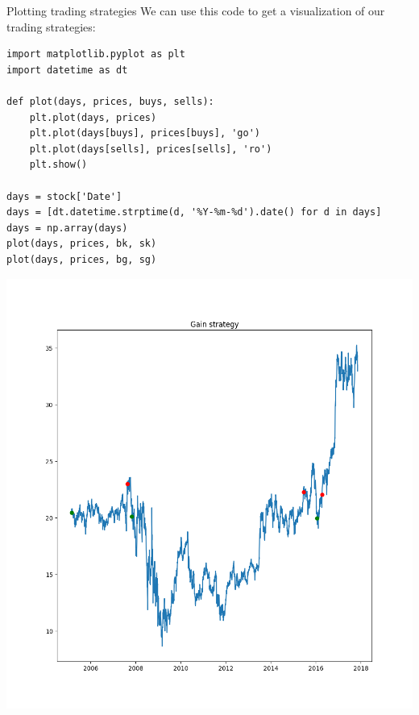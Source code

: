 \documentclass[aspectratio=169,handout]{beamer}
\begin{document}
\begin{frame}[fragile]{Plotting trading strategies}
    We can use this code to get a visualization of our trading strategies:
    \begin{minipage}{0.49\textwidth}
        \begin{verbatim}
import matplotlib.pyplot as plt
import datetime as dt

def plot(days, prices, buys, sells):
    plt.plot(days, prices)
    plt.plot(days[buys], prices[buys], 'go')
    plt.plot(days[sells], prices[sells], 'ro')
    plt.show()

days = stock['Date']
days = [dt.datetime.strptime(d, '%Y-%m-%d').date() for d in days]
days = np.array(days)
plot(days, prices, bk, sk)
plot(days, prices, bg, sg)
        \end{verbatim}
    \end{minipage}
    \pause
    \begin{minipage}{0.49\textwidth}
        \center
        \includegraphics[width=.8\textwidth]{./plots/plot4.png}
    \end{minipage}
\end{frame}
\end{document}
